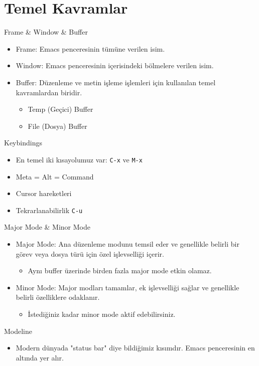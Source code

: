 \documentclass[presentation,smaller]{beamer}
\begin{document}
\section{Temel Kavramlar}
\label{sec:org0feff97}
\begin{frame}[label={sec:orgd3489e6}]{Frame \& Window \& Buffer}
\begin{itemize}
\item \alert{Frame}: Emacs penceresinin tümüne verilen isim.
\item \alert{Window}: Emacs penceresinin içerisindeki bölmelere verilen isim.
\item \alert{Buffer}: Düzenleme ve metin işleme işlemleri için kullanılan temel kavramlardan biridir.
\begin{itemize}
\item Temp (Geçici) Buffer
\item File (Dosya) Buffer
\end{itemize}
\end{itemize}
\end{frame}
\begin{frame}[label={sec:org8da95c8},fragile]{Keybindings}
 \begin{itemize}
\item En temel iki kısayolumuz var: \texttt{C-x} ve \texttt{M-x}
\item Meta = Alt = Command
\item Cursor hareketleri
\item Tekrarlanabilirlik \texttt{C-u}
\end{itemize}
\end{frame}
\begin{frame}[label={sec:org44c4e43}]{Major Mode \& Minor Mode}
\begin{itemize}
\item \alert{Major Mode}: Ana düzenleme modunu temsil eder ve genellikle belirli bir görev
veya dosya türü için özel işlevselliği içerir.
\begin{itemize}
\item Aynı buffer üzerinde birden fazla major mode etkin olamaz.
\end{itemize}
\item \alert{Minor Mode}: Major modları tamamlar, ek işlevselliği sağlar ve genellikle
belirli özelliklere odaklanır.
\begin{itemize}
\item İstediğiniz kadar minor mode aktif edebilirsiniz.
\end{itemize}
\end{itemize}
\end{frame}
\begin{frame}[label={sec:org8fb1fd7}]{Modeline}
\begin{itemize}
\item Modern dünyada "status bar" diye bildiğimiz kısımdır. Emacs penceresinin en
altında yer alır.
\end{itemize}
\end{frame}
\end{document}
